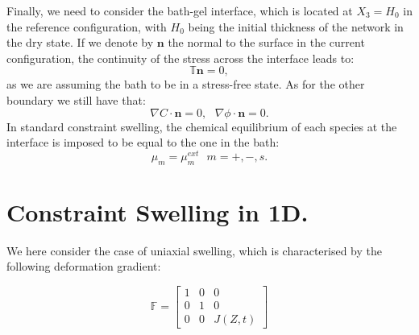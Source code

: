 \documentclass[12pt]{extarticle}
\newcommand{\F}{\ensuremath{\mathbb{F}}}
\begin{document}
Finally, we need to consider the bath-gel interface, which is located at $X_3=H_0$ in the reference configuration, with $H_0$ being the initial thickness of the network in the dry state. If we denote by $\mathbf{n}$ the normal to the surface in the current configuration, the continuity of the stress across the interface leads to: 
\begin{equation}
\mathbb{T} \mathbf{n}=0,
\end{equation}
as we are assuming the bath to be in a stress-free state. As for the other boundary we still have that:
\begin{equation}
\nabla C \cdot \mathbf{n} = 0, \ \ \ \nabla \phi \cdot \mathbf{n}=0.
\end{equation}
In standard constraint swelling, the chemical equilibrium of each species at the interface is imposed to be equal to the one in the bath:
\begin{equation}
\mu_m =\mu_m^{ext} \ \ \ m=+,-,s.
\end{equation}

\section{Constraint Swelling in 1D.}
We here consider the case of uniaxial swelling, which is characterised by the following deformation gradient:

\begin{equation}
\F= \begin{bmatrix}
1 &0&0\\
0&1&0\\
0&0& J(Z,t)
\end{bmatrix}                                                                
\end{equation}
\end{document}
